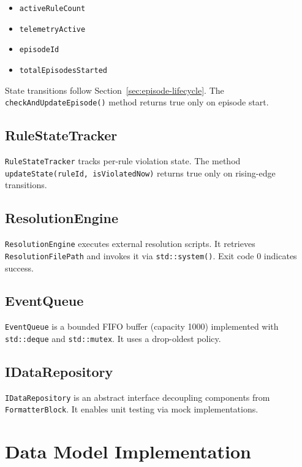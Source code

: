 \begin{itemize}
\item \texttt{activeRuleCount}
\item \texttt{telemetryActive}
\item \texttt{episodeId}
\item \texttt{totalEpisodesStarted}
\end{itemize}

State transitions follow Section~\ref{sec:episode-lifecycle}. The \texttt{checkAndUpdateEpisode()} method returns true only on episode start.

\subsection{RuleStateTracker}

\texttt{RuleStateTracker} tracks per-rule violation state. The method \texttt{updateState(ruleId, isViolatedNow)} returns true only on rising-edge transitions.

\subsection{ResolutionEngine}

\texttt{ResolutionEngine} executes external resolution scripts. It retrieves \texttt{ResolutionFilePath} and invokes it via \texttt{std::system()}. Exit code 0 indicates success.

\subsection{EventQueue}

\texttt{EventQueue} is a bounded FIFO buffer (capacity 1000) implemented with \texttt{std::deque} and \texttt{std::mutex}. It uses a drop-oldest policy.

\subsection{IDataRepository}

\texttt{IDataRepository} is an abstract interface decoupling components from \texttt{FormatterBlock}. It enables unit testing via mock implementations.

\section{Data Model Implementation}\label{sec:data-model-impl}

